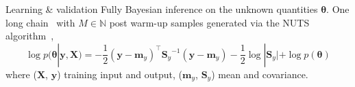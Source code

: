 \documentclass[final]{beamer}
\begin{document}
\begin{frame}[t]
{\begin{minipage}[t][76cm][t]{58cm}
{\begin{minipage}[t][40cm][t]{28cm}
          \begin{block}{Learning \& validation}
            Fully Bayesian inference on the unknown quantities $\bm{\theta}$.
            One long chain~\citep{raftery1992} with $M \in \mathbb{N}$
            post warm-up samples generated via the NUTS
            algorithm~\citep{hoffman2014},
            \begin{equation}
              \log p(\bm{\theta} | \mathbf{y}, \mathbf{X})
              = -\frac{1}{2}
                 {(\mathbf{y} - \mathbf{m}_y)}^\top
                 {\mathbf{S}_y}^{-1}
                 {(\mathbf{y} - \mathbf{m}_y)}
                 -\frac{1}{2}
                 \log | \mathbf{S}_y |
                 + \log p(\bm{\theta})
               \end{equation}
               where
               ($\mathbf{X}$, $\mathbf{y}$) training input and output,
               ($\mathbf{m}_y $, $\mathbf{S}_y $) mean and covariance.


\end{block}
\end{minipage}}
\end{minipage}}
\end{frame}
\end{document}
